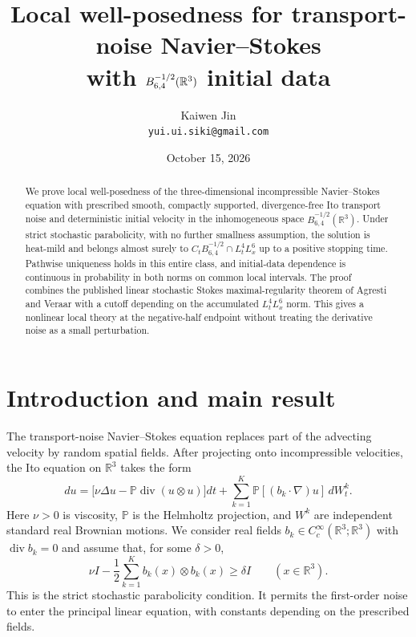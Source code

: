 \documentclass[11pt]{article}
\title{Local well-posedness for transport-noise Navier--Stokes\protect\\
with $B^{-1/2}_{6,4}(\R^3)$ initial data}
\author{Kaiwen Jin\\\small\texttt{yui.ui.siki@gmail.com}}
\date{October 15, 2026}
\newcommand{\R}{\mathbb R}
\newcommand{\Pp}{\mathbb P}
\numberwithin{equation}{section}
\begin{document}
\maketitle
\begin{abstract}
We prove local well-posedness of the three-dimensional incompressible
Navier--Stokes equation with prescribed smooth, compactly supported,
divergence-free Ito transport noise and deterministic initial velocity in
the inhomogeneous space $B^{-1/2}_{6,4}(\R^3)$. Under strict stochastic
parabolicity, with no further smallness assumption, the solution is heat-mild
and belongs almost surely to $C_tB^{-1/2}_{6,4}\cap L^4_tL^6_x$ up to a
positive stopping time. Pathwise uniqueness holds in this entire class, and
initial-data dependence is continuous in probability in both norms on common
local intervals. The proof combines the published linear stochastic Stokes
maximal-regularity theorem of Agresti and Veraar with a cutoff depending on
the accumulated $L^4_tL^6_x$ norm. This gives a nonlinear local theory at the
negative-half endpoint without treating the derivative noise as a small
perturbation.
\end{abstract}

\section{Introduction and main result}
The transport-noise Navier--Stokes equation replaces part of the advecting
velocity by random spatial fields. After projecting onto incompressible
velocities, the Ito equation on $\R^3$ takes the form
\begin{equation}\label{eq:NS}
 du=\big[\nu\Delta u-\Pp\operatorname{div}(u\otimes u)\big]dt
       +\sum_{k=1}^K\Pp[(b_k\cdot\nabla)u]\,dW_t^k.
\end{equation}
Here $\nu>0$ is viscosity, $\Pp$ is the Helmholtz projection, and $W^k$
are independent standard real Brownian motions. We consider real fields
$b_k\in C_c^\infty(\R^3;\R^3)$ with $\operatorname{div}b_k=0$ and assume
that, for some $\delta>0$,
\begin{equation}\label{eq:parabolic}
 \nu I-\frac12\sum_{k=1}^Kb_k(x)\otimes b_k(x)\geq\delta I
 \qquad (x\in\R^3).
\end{equation}
This is the strict stochastic parabolicity condition. It permits the
first-order noise to enter the principal linear equation, with constants
depending on the prescribed fields.
\end{document}
